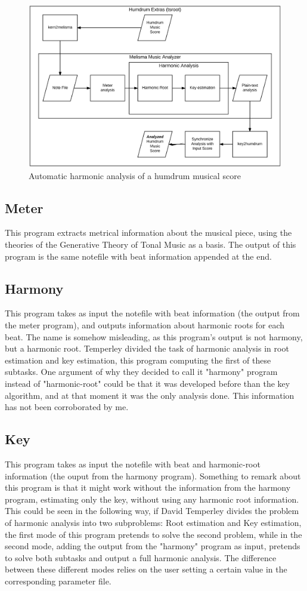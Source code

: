   \begin{figure}[ht]
    \centering
      \includegraphics[width=1.0\textwidth]{04-methodology/figures/3}
    \caption{Automatic harmonic analysis of a humdrum musical score}
    \label{fig:software_stack3}
  \end{figure}

  \subsection{Meter}
    This program extracts metrical information about the musical piece, using the theories of the Generative Theory of Tonal Music as a basis.
    The output of this program is the same notefile with beat information appended at the end.
  \subsection{Harmony}
    This program takes as input the notefile with beat information (the output from the meter program), and outputs information about harmonic roots for each beat. The name is somehow misleading, as this program's output is not harmony, but a harmonic root. Temperley divided the task of harmonic analysis in root estimation and key estimation, this program computing the first of these subtasks. One argument of why they decided to call it "harmony" program instead of "harmonic-root" could be that it was developed before than the key algorithm, and at that moment it was the only analysis done. This information has not been corroborated by me.
  \subsection{Key}
    This program takes as input the notefile with beat and harmonic-root information (the ouput from the harmony program). Something to remark about this program is that it might work without the information from the harmony program, estimating only the key, without using any harmonic root information. This could be seen in the following way, if David Temperley divides the problem of harmonic analysis into two subproblems: Root estimation and Key estimation, the first mode of this program pretends to solve the second problem, while in the second mode, adding the output from the "harmony" program as input, pretends to solve both subtasks and output a full harmonic analysis. The difference between these different modes relies on the user setting a certain value in the corresponding parameter file.
